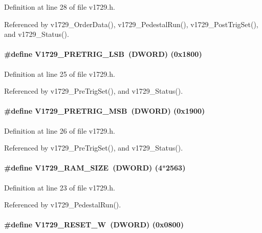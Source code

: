 Definition at line 28 of file v1729.h.

Referenced by v1729\_\-OrderData(), v1729\_\-PedestalRun(), v1729\_\-PostTrigSet(), and v1729\_\-Status().
\paragraph[{V1729\_\-PRETRIG\_\-LSB}]{\setlength{\rightskip}{0pt plus 5cm}\#define V1729\_\-PRETRIG\_\-LSB~({\bf DWORD}) (0x1800)}\hfill\label{v1729_8h_a246e19dc6d54bd553ba02379b216d936}


Definition at line 25 of file v1729.h.

Referenced by v1729\_\-PreTrigSet(), and v1729\_\-Status().
\paragraph[{V1729\_\-PRETRIG\_\-MSB}]{\setlength{\rightskip}{0pt plus 5cm}\#define V1729\_\-PRETRIG\_\-MSB~({\bf DWORD}) (0x1900)}\hfill\label{v1729_8h_ac8cd9f8600bea9188275e5584e2ffbb7}


Definition at line 26 of file v1729.h.

Referenced by v1729\_\-PreTrigSet(), and v1729\_\-Status().
\paragraph[{V1729\_\-RAM\_\-SIZE}]{\setlength{\rightskip}{0pt plus 5cm}\#define V1729\_\-RAM\_\-SIZE~({\bf DWORD}) (4$\ast$2563)}\hfill\label{v1729_8h_ab6a21048e1c81fa03bdb688d9f86df83}


Definition at line 23 of file v1729.h.

Referenced by v1729\_\-PedestalRun().
\paragraph[{V1729\_\-RESET\_\-W}]{\setlength{\rightskip}{0pt plus 5cm}\#define V1729\_\-RESET\_\-W~({\bf DWORD}) (0x0800)}\hfill\label{v1729_8h_a266316d718a80c9ffabf75b2bec10b78}


